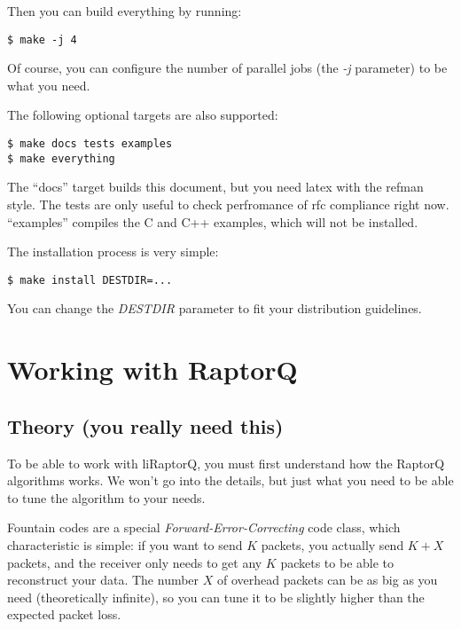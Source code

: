 \documentclass[11pt,a4paper]{refart}
\begin{document}
Then you can build everything by running:
\begin{verbatim}
$ make -j 4
\end{verbatim}
Of course, you can configure the number of parallel jobs (the \textit{-j} parameter) to be what you need.

The following optional targets are also supported:
\begin{verbatim}
$ make docs tests examples
$ make everything
\end{verbatim}
The ``docs'' target builds this document, but you need latex with the refman style.
The tests are only useful to check perfromance of rfc compliance right now. ``examples'' compiles the C and C++ examples, which will not be installed.

The installation process is very simple:

\begin{verbatim}
$ make install DESTDIR=...
\end{verbatim}

You can change the \textit{DESTDIR} parameter to fit your distribution guidelines.

\newpage


\section{Working with RaptorQ}
\subsection{Theory (you really need this)}

To be able to work with liRaptorQ, you must first understand how the RaptorQ algorithms works. We won't go into the details, but just what you need
to be able to tune the algorithm to your needs.


Fountain codes are a special \textit{Forward-Error-Correcting} code class, which characteristic is simple: if you want to send $K$ packets, you actually
send $K+X$ packets, and the receiver only needs to get any $K$ packets to be able to reconstruct your data. The number $X$ of overhead packets can be as big
as you need (theoretically infinite), so you can tune it to be slightly higher than the expected packet loss.
\end{document}
